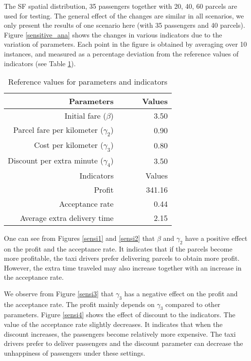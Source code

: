 \documentclass[preprint,authoryear,12pt]{elsarticle}
\begin{document}
The SF spatial distribution, 35 passengers together with 20, 40, 60 parcels are used for testing. The general effect of the changes are similar in all scenarios, we only present the results of one scenario here (with 35 passengers and 40 parcels). Figure \ref{sensitive_ana} shows the changes in various indicators due to the variation of parameters. Each point in the figure is obtained by averaging over 10 instances, and measured as a percentage deviation from the reference values of indicators (see Table \ref{FIX}).

\begin{table} [!htbp]
\caption{Reference values for parameters and indicators}
\vspace{-1em}
\small
\center
\begin{tabular}{rr}
\hline
Parameters &~~~~ Values\\
\hline
Initial fare ($\beta$)& {3.50}\\
Parcel fare per kilometer ($\gamma_2$) &{0.90} \\
Cost per kilometer ($\gamma_3$) &{0.80} \\
Discount per extra minute ($\gamma_4$) &{3.50}\\
\hline
Indicators &~~~~ Values\\
\hline
Profit & 341.16\\
Acceptance rate & 0.44\\
Average extra delivery time & 2.15\\
\hline
\end{tabular}
\label{FIX}
\end{table}

One can see from Figures \ref{sensi1} and \ref{sensi2} that $\beta$ and $\gamma_2$ have a positive effect on the profit and the acceptance rate. It indicates that if the parcels become more profitable, the taxi drivers prefer delivering parcels to obtain more profit. However, the extra time traveled may also increase together with an increase in the acceptance rate. 

We observe from Figure \ref{sensi3} that $\gamma_3$ has a negative effect on the profit and the acceptance rate. The profit mainly depends on $\gamma_3$ compared to other parameters. Figure \ref{sensi4} shows the effect of discount to the indicators. The value of the acceptance rate slightly decreases. It indicates that when the discount increases, the passengers become relatively more expensive. The taxi drivers prefer to deliver passengers and the discount parameter can decrease the unhappiness of passengers under these settings. 
\end{document}
